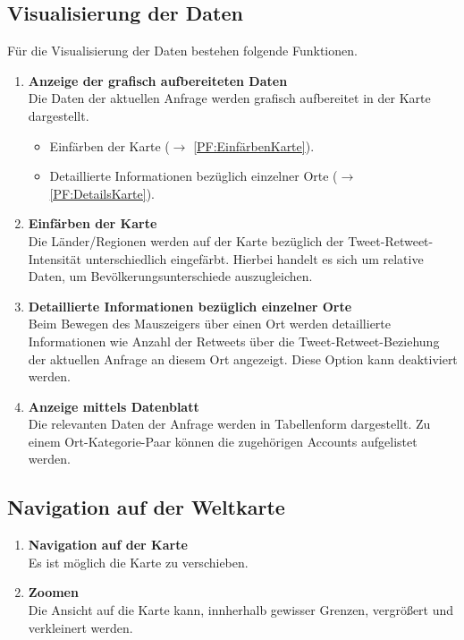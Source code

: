\subsection{Visualisierung der Daten}	
Für die Visualisierung der Daten bestehen folgende Funktionen.
\begin{enumerate}[ align=left, label={\textbf{\textbackslash F20\arabic*0\textbackslash}} ]	
	\item \textbf{Anzeige der grafisch aufbereiteten Daten} \\
	Die Daten der aktuellen Anfrage werden grafisch aufbereitet in der Karte dargestellt.
	\begin{itemize}
		\item Einfärben der Karte ($\rightarrow$ \ref{PF:EinfärbenKarte}).
		\item Detaillierte Informationen bezüglich einzelner Orte ($\rightarrow$ \ref{PF:DetailsKarte}).
	\end{itemize}
	
	\item \textbf{Einfärben der Karte} \label{PF:EinfärbenKarte} \\
	Die Länder/Regionen werden auf der Karte bezüglich der Tweet-Retweet-Intensität unterschiedlich eingefärbt. Hierbei handelt es sich um relative Daten, um Bevölkerungsunterschiede auszugleichen.
	\item \textbf{Detaillierte Informationen bezüglich einzelner Orte} \label{PF:DetailsKarte} \\
	Beim Bewegen des Mauszeigers über einen Ort werden detaillierte Informationen wie Anzahl der Retweets über die Tweet-Retweet-Beziehung der aktuellen Anfrage an diesem Ort angezeigt. Diese Option kann deaktiviert werden.
	
	
	\item \textbf{Anzeige mittels Datenblatt} \label{PF:AnzeigeDatenblatt} \\
	Die relevanten Daten der Anfrage werden in Tabellenform dargestellt. Zu einem Ort-Kategorie-Paar können die zugehörigen Accounts aufgelistet werden.
	

\end{enumerate}

\subsection{Navigation auf der Weltkarte}
\begin{enumerate}[ align=left, label={\textbf{\textbackslash F30\arabic*0\textbackslash}} ]
	\item \textbf{Navigation auf der Karte} \label{PF:Navigation} \\
	Es ist möglich die Karte zu verschieben.
	\item \textbf{Zoomen} \label{PF:Zoomen} \\
	Die Ansicht auf die Karte kann, innherhalb gewisser Grenzen, vergrößert und verkleinert werden.
\end{enumerate}	

